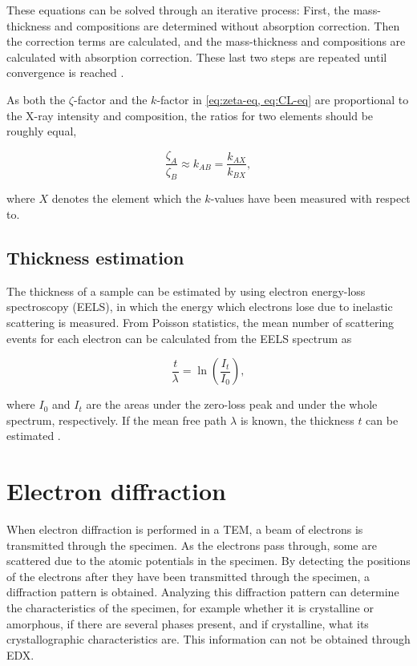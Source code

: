 These equations can be solved through an iterative process: First, the mass-thickness and compositions are determined without absorption correction. Then the correction terms are calculated, and the mass-thickness and compositions are calculated with absorption correction. These last two steps are repeated until convergence is reached \cite{zeta-method}.

As both the $\zeta$-factor and the $k$-factor in \cref{eq:zeta-eq, eq:CL-eq} are proportional to the X-ray intensity and composition, the ratios for two elements should be roughly equal,

\begin{equation}
\label{compare_zeta_CL}
\frac{\zeta_A}{\zeta_B} \approx k_{AB} = \frac{k_{AX}}{k_{BX}},
\end{equation}

where $X$ denotes the element which the $k$-values have been measured with respect to.

	\subsection{Thickness estimation}
	\label{sec:theory/thickness-est}
The thickness of a sample can be estimated by using electron energy-loss spectroscopy (EELS), in which the energy which electrons lose due to inelastic scattering is measured. From Poisson statistics, the mean number of scattering events for each electron can be calculated from the EELS spectrum as 

\begin{equation}
\label{eq:logratio}
\dfrac{t}{\lambda}=\ln (\dfrac{I_t}{I_0}),
\end{equation}

where $I_0$ and $I_t$ are the areas under the zero-loss peak and under the whole spectrum, respectively. If the mean free path $\lambda$ is known, the thickness $t$ can be estimated \cite{eels-bok,logratio-article}.

\section{Electron diffraction}\label{ED}
When electron diffraction is performed in a TEM, a beam of electrons is transmitted through the specimen. As the electrons pass through, some are scattered due to the atomic potentials in the specimen. By detecting the positions of the electrons after they have been transmitted through the specimen, a diffraction pattern is obtained. Analyzing this diffraction pattern can determine the characteristics of the specimen, for example whether it is crystalline or amorphous, if there are several phases present, and if crystalline, what its crystallographic characteristics are. This information can not be obtained through EDX.

